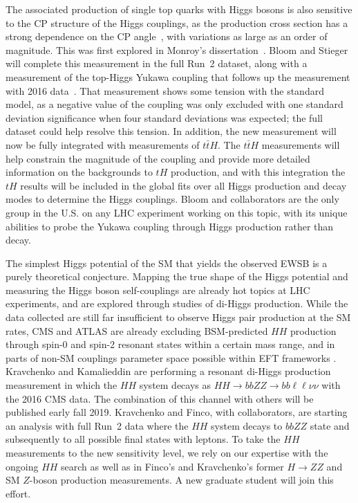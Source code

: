 The associated production of single top quarks with Higgs bosons is also sensitive to the CP structure of the Higgs couplings, as the production cross section has a strong dependence on the CP angle~\cite{bib:tH_theory}, with variations as large as an order of magnitude.  This was first explored in Monroy's dissertation~\cite{bib:monroy_thesis}. Bloom and Stieger will complete this measurement in the full Run~2 dataset, along with a measurement of the top-Higgs Yukawa coupling that follows up the measurement with 2016 data~\cite{bib:tHqRun2}.  That measurement shows some tension with the standard model, as a negative value of the coupling was only excluded with one standard deviation significance when four standard deviations was expected; the full dataset could help resolve this tension.  In addition, the new measurement will now be fully integrated with measurements of $t\bar{t}H$.  The $t\bar{t}H$ measurements will help constrain the magnitude of the coupling and provide more detailed information on the backgrounds to $tH$ production, and with this integration the $tH$ results will be included in the global fits over all Higgs production and decay modes to determine the Higgs couplings.  Bloom and collaborators are the only group in the U.S. on any LHC experiment working on this topic, with its unique abilities to probe the Yukawa coupling through Higgs production rather than decay.

The simplest Higgs potential of the SM that yields the observed EWSB is a purely theoretical conjecture. Mapping the true shape of the Higgs potential and measuring the Higgs boson self-couplings are already hot topics at LHC experiments, and are explored through studies of di-Higgs production. While the data collected are still far insufficient to observe Higgs pair production at the SM rates, CMS and ATLAS are already excluding BSM-predicted $HH$ production through spin-0 and spin-2 resonant states \cite{bib:radion-graviton-CMS,bib:radion-graviton-ATLAS} within a certain mass range, and in parts of non-SM couplings parameter space possible within EFT frameworks \cite{bib:HH-benchmarks}. Kravchenko and Kamalieddin are performing a resonant di-Higgs production measurement in which 
the $HH$ system decays as $HH\to bbZZ\to bb\ell\ell\nu\nu$ with the 2016 CMS data.
The combination of this channel with others will be published early fall 2019. Kravchenko and Finco, with collaborators, are starting an analysis with full Run~2 data where the $HH$ system decays to $bbZZ$ state and subsequently to all possible final states with leptons. To take the $HH$ measurements to the new sensitivity level, we rely on our expertise with the ongoing $HH$ search as well as in Finco's and Kravchenko's former $H\to ZZ$ and SM $Z$-boson production measurements. A new graduate student will join this effort.

